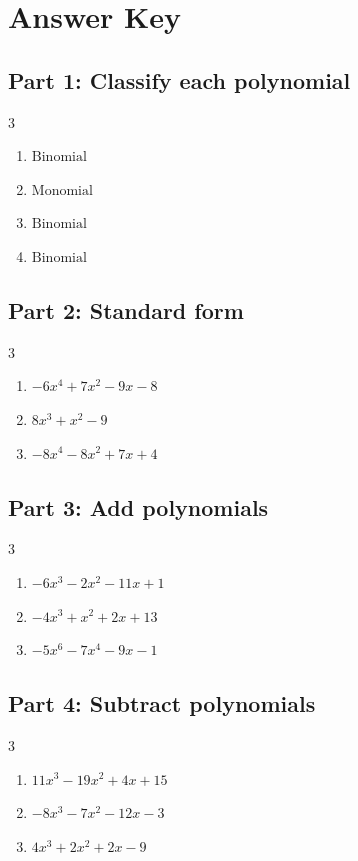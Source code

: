 \documentclass[11pt]{article}
\begin{document}
\newpage
{}
\section*{Answer Key}
\subsection*{Part 1: Classify each polynomial}
\begin{multicols}{3}
\begin{enumerate}
  \item $\text{Binomial}$
  \item $\text{Monomial}$
  \item $\text{Binomial}$
  \item $\text{Binomial}$
\end{enumerate}
\end{multicols}
\subsection*{Part 2: Standard form}
\begin{multicols}{3}
\begin{enumerate}
  \item $-6x^{4} + 7x^{2} - 9x - 8$
  \item $8x^{3} + x^{2} - 9$
  \item $-8x^{4} - 8x^{2} + 7x + 4$
\end{enumerate}
\end{multicols}
\subsection*{Part 3: Add polynomials}
\begin{multicols}{3}
\begin{enumerate}
  \item $-6x^{3} - 2x^{2} - 11x + 1$
  \item $-4x^{3} + x^{2} + 2x + 13$
  \item $-5x^{6} - 7x^{4} - 9x - 1$
\end{enumerate}
\end{multicols}
\subsection*{Part 4: Subtract polynomials}
\begin{multicols}{3}
\begin{enumerate}
  \item $11x^{3} - 19x^{2} + 4x + 15$
  \item $-8x^{3} - 7x^{2} - 12x - 3$
  \item $4x^{3} + 2x^{2} + 2x - 9$
\end{enumerate}
\end{multicols}
\end{document}
